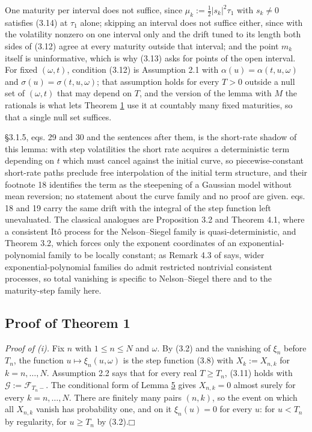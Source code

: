 \documentclass[11pt]{article}
\providecommand{\square}{\mdlgwhtsquare}
\begin{document}
One maturity per interval does not suffice, since \(\mu_k := \tfrac12 |s_k|^2 \tau_1\) with \(s_k \ne 0\) satisfies (3.14) at \(\tau_1\) alone; skipping an interval does not suffice either, since with the volatility nonzero on one interval only and the drift tuned to its length both sides of (3.12) agree at every maturity outside that interval; and the point \(m_k\) itself is uninformative, which is why (3.13) asks for points of the open interval. For fixed \((\omega, t)\), condition (3.12) is Assumption 2.1 with \(\alpha(u) = \alpha(t, u, \omega)\) and \(\sigma(u) = \sigma(t, u, \omega)\); that assumption holds for every \(T > 0\) outside a null set of \((\omega, t)\) that may depend on \(T\), and the version of the lemma with \(M\) the rationals is what lets Theorem \hyperref[res:Theorem-1]{1} use it at countably many fixed maturities, so that a single null set suffices.

\cite{gellert2021short} §3.1.5, eqs. 29 and 30 and the sentences after them, is the short-rate shadow of this lemma: with step volatilities the short rate acquires a deterministic term depending on \(t\) which must cancel against the initial curve, so piecewise-constant short-rate paths preclude free interpolation of the initial term structure, and their footnote 18 identifies the term as the steepening of a Gaussian model without mean reversion; no statement about the curve family and no proof are given. \cite{brace2024sofr} eqs. 18 and 19 carry the same drift with the integral of the step function left unevaluated. The classical analogues are \cite{filipovic1999note} Proposition 3.2 and Theorem 4.1, where a consistent Itô process for the Nelson--Siegel family is quasi-deterministic, and \cite{filipovic2000exponential} Theorem 3.2, which forces only the exponent coordinates of an exponential-polynomial family to be locally constant; as Remark 4.3 of \cite{filipovic1999note} says, wider exponential-polynomial families do admit restricted nontrivial consistent processes, so total vanishing is specific to Nelson--Siegel there and to the maturity-step family here.

\subsection{Proof of Theorem 1}\label{sec:3.3}

\emph{Proof of (i).} Fix \(n\) with \(1 \le n \le N\) and \(\omega\). By (3.2) and the vanishing of \(\xi_n\) before \(T_n\), the function \(u \mapsto \xi_n(u, \omega)\) is the step function (3.8) with \(X_k := X_{n,k}\) for \(k = n, \dots, N\). Assumption 2.2 says that for every real \(T \ge T_n\), (3.11) holds with \(\mathcal G := \mathcal F_{T_n-}\). The conditional form of Lemma \hyperref[res:Lemma-5]{5} gives \(X_{n,k} = 0\) almost surely for every \(k = n, \dots, N\). There are finitely many pairs \((n, k)\), so the event on which all \(X_{n,k}\) vanish has probability one, and on it \(\xi_n(u) = 0\) for every \(u\): for \(u < T_n\) by regularity, for \(u \ge T_n\) by (3.2).\hfill$\square$
\end{document}
